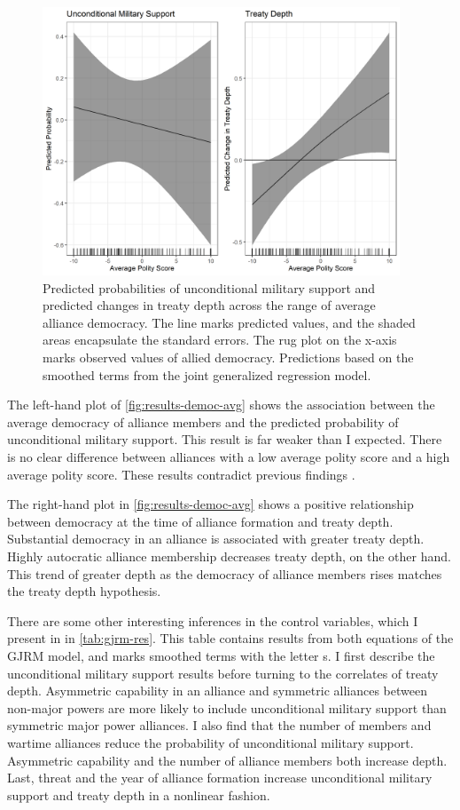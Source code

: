 \documentclass[12pt]{article}
\begin{document}
\begin{figure}[hbtp]
\centering
\includegraphics[width=0.95\textwidth]{../figures/results-democ-avg.png}
\caption{Predicted probabilities of unconditional military support and predicted changes in treaty depth across the range of average alliance democracy. The line marks predicted values, and the shaded areas encapsulate the standard errors. The rug plot on the x-axis marks observed values of allied democracy. Predictions based on the smoothed terms from the joint generalized regression model.}
\label{fig:results-democ-avg}
\end{figure}


The left-hand plot of \autoref{fig:results-democ-avg} shows the association between the average democracy of alliance members and the predicted probability of unconditional military support. 
This result is far weaker than I expected.  
There is no clear difference between alliances with a low average polity score and a high average polity score. 
These results contradict previous findings \citep{Mattes2012, Chibaetal2015}.


The right-hand plot in \autoref{fig:results-democ-avg} shows a positive relationship between democracy at the time of alliance formation and treaty depth.
Substantial democracy in an alliance is associated with greater treaty depth. 
Highly autocratic alliance membership decreases treaty depth, on the other hand. 
This trend of greater depth as the democracy of alliance members rises matches the treaty depth hypothesis. 


There are some other interesting inferences in the control variables, which I present in in \autoref{tab:gjrm-res}. 
This table contains results from both equations of the GJRM model, and marks smoothed terms with the letter s. 
I first describe the unconditional military support results before turning to the correlates of treaty depth. 
Asymmetric capability in an alliance and symmetric alliances between non-major powers are more likely to include unconditional military support than symmetric major power alliances. 
I also find that the number of members and wartime alliances reduce the probability of unconditional military support. 
Asymmetric capability and the number of alliance members both increase depth. 
Last, threat and the year of alliance formation increase unconditional military support and treaty depth in a nonlinear fashion. 
\end{document}

